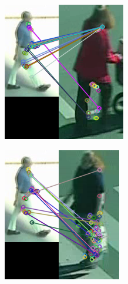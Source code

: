\begin{figure}[!h]
\begin{subfigure}[!h]{0.24\textwidth}
	\end{subfigure}
	\begin{subfigure}[!h]{0.24\textwidth}
		\includegraphics[width=\linewidth]{images/recognition/kpSample_falsePositive}
	\end{subfigure}
	\begin{subfigure}[!h]{0.24\textwidth}
		\includegraphics[width=\linewidth]{images/recognition/kpSample_object}

\end{subfigure}
\end{figure}
